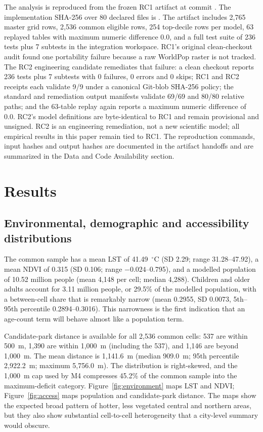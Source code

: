 \documentclass[times,twoside]{_Templates/MultiTargetManuscript}
\begin{document}
The analysis is reproduced from the frozen RC1 artifact at commit
\texttt{}. The implementation SHA-256
over 80 declared files is
\texttt{}.
The artifact includes 2,765 master grid rows, 2,536 common eligible rows, 254
top-decile rows per model, 63 replayed tables with maximum numeric difference
0.0, and a full test suite of 236 tests plus 7 subtests in the integration
workspace. RC1's original clean-checkout audit found one portability failure
because a raw WorldPop raster is not tracked. The RC2 engineering candidate
remediates that failure: a clean checkout reports 236 tests plus 7 subtests with
0 failures, 0 errors and 0 skips; RC1 and RC2 receipts each validate 9/9 under a
canonical Git-blob SHA-256 policy; the standard and remediation output manifests
validate 69/69 and 80/80 relative paths; and the 63-table replay again reports a
maximum numeric difference of 0.0. RC2's model definitions are byte-identical to
RC1 and remain provisional and unsigned. RC2 is an engineering remediation, not
a new scientific model; all empirical results in this paper remain tied to RC1.
The reproduction commands, input hashes and output hashes are documented in the
artifact handoffs and are summarized in the Data and Code Availability section.

\section{Results}

\subsection{Environmental, demographic and accessibility distributions}

The common sample has a mean LST of 41.49~$^\circ$C (SD 2.29; range
31.28--47.92), a mean NDVI of 0.315 (SD 0.106; range $-0.024$--0.795), and a
modelled population of 10.52 million people (mean 4,148 per cell; median 4,288).
Children and older adults account for 3.11 million people, or 29.5\% of the
modelled population, with a between-cell share that is remarkably narrow
(mean 0.2955, SD 0.0073, 5th--95th percentile 0.2894--0.3016). This narrowness
is the first indication that an age-count term will behave almost like a
population term.

Candidate-park distance is available for all 2,536 common cells: 537 are within
500~m, 1,390 are within 1,000~m (including the 537), and 1,146 are beyond
1,000~m. The mean distance is
1,141.6~m (median 909.0~m; 95th percentile 2,922.2~m; maximum 5,756.0~m).
The distribution is right-skewed, and the 1,000~m cap used by M4 compresses 45.2\%
of the common sample into the maximum-deficit category. Figure~\ref{fig:environment}
maps LST and NDVI; Figure~\ref{fig:access} maps population and candidate-park
distance. The maps show the expected broad pattern of hotter, less vegetated
central and northern areas, but they also show substantial cell-to-cell
heterogeneity that a city-level summary would obscure.
\end{document}
